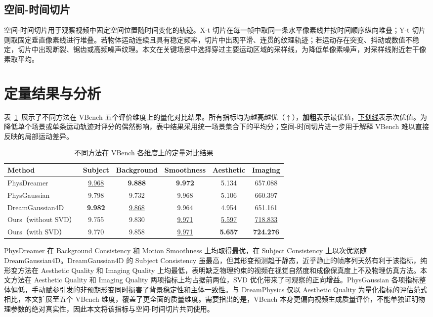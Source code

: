 \subsection{空间-时间切片}
空间-时间切片用于观察视频中固定空间位置随时间变化的轨迹。X-t 切片在每一帧中取同一条水平像素线并按时间顺序纵向堆叠；Y-t 切片则取固定垂直像素线进行堆叠。若物体运动连续且具有稳定频率，切片中出现平滑、连贯的纹理轨迹；若运动存在突变、抖动或数值不稳定，切片中出现断裂、锯齿或高频噪声纹理。本文在关键场景中选择穿过主要运动区域的采样线，为降低单像素噪声，对采样线附近若干像素取平均。

\section{定量结果与分析}

表~\ref{tab:vbench_main}~展示了不同方法在 VBench 五个评价维度上的量化对比结果。所有指标均为越高越优（$\uparrow$），\textbf{加粗}表示最优值，\underline{下划线}表示次优值。为降低单个场景或单条运动轨迹对评分的偶然影响，表中结果采用统一场景集合下的平均分；空间-时间切片进一步用于解释 VBench 难以直接反映的局部运动差异。

\begin{table}[!htbp]
    \centering
    \caption{不同方法在 VBench 各维度上的定量对比结果}
    \label{tab:vbench_main}
    \begin{tabular}{lccccc}
        \toprule
        \textbf{Method} & \textbf{Subject} & \textbf{Background} & \textbf{Smoothness} & \textbf{Aesthetic} & \textbf{Imaging} \\
        \midrule
        PhysDreamer       & \underline{9.968} & \textbf{9.888} & \textbf{9.972} & 5.134   & 657.088 \\
        PhysGaussian      & 9.798 & 9.732 & 9.968 & 5.106   & 660.397 \\
        DreamGaussian4D   & \textbf{9.982} & \underline{9.868} & 9.964 & 4.954   & 651.161 \\
        Ours（without SVD） & 9.755 & 9.830 & \underline{9.971} & \underline{5.597} & \underline{718.833} \\
        Ours（with SVD）    & 9.770 & 9.858 & \underline{9.971} & \textbf{5.657} & \textbf{724.276} \\
        \bottomrule
    \end{tabular}
\end{table}

PhysDreamer 在 Background Consistency 和 Motion Smoothness 上均取得最优，在 Subject Consistency 上以次优紧随 DreamGaussian4D。DreamGaussian4D 的 Subject Consistency 虽最高，但其形变预测趋于静态，近乎静止的帧序列天然有利于该指标，纯形变方法在 Aesthetic Quality 和 Imaging Quality 上均最低，表明缺乏物理约束的视频在视觉自然度和成像保真度上不及物理仿真方法。本文方法在 Aesthetic Quality 和 Imaging Quality 两项指标上均占据前两位，SVD 优化带来了可观察的正向增益。PhysGaussian 各项指标整体偏低，手动赋参引发的非预期形变同时损害了背景稳定性和主体一致性。与 DreamPhysics\cite{dreamphysics} 仅以 Aesthetic Quality 为量化指标的评估范式相比，本文扩展至五个 VBench 维度，覆盖了更全面的质量维度。需要指出的是，VBench 本身更偏向视频生成质量评价，不能单独证明物理参数的绝对真实性，因此本文将该指标与空间-时间切片共同使用。

